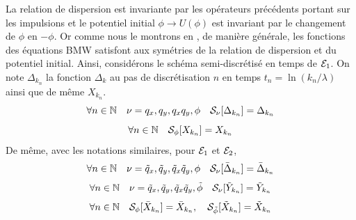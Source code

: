 \documentclass[10pt]{article}
\begin{document}
\begin{multicols}{2}
La relation de dispersion est invariante par les opérateurs précédents portant sur les impulsions et le potentiel initial $\phi \to U(\phi)$ est invariant par le changement de $\phi$ en $- \phi$. Or comme nous le montrons en , de manière générale, les fonctions des équations BMW satisfont aux symétries de la relation de dispersion et du potentiel initial. Ainsi, considérons le schéma semi-discrétisé en temps de $\mathcal{E}_1$. On note $\Delta_{k_n}$ la fonction $\Delta_k$ au pas de discrétisation $n$ en temps $t_n = \ln(k_n/\lambda)$ ainsi que de même $X_{k_n}$. 
\begin{equation}
\forall n \in \mathbb{N} \quad \nu =  q_x,q_y,q_xq_y,\phi \quad  \mathcal{S}_\nu[\Delta_{k_{n}}] = \Delta_{k_{n}} 
\end{equation}
\begin{equation}
\forall n \in \mathbb{N} \quad   \mathcal{S}_\phi[X_{k_{n}}] = X_{k_{n}} 
\end{equation}
De même, avec les notations similaires, pour $\mathcal{E}_1$ et $\mathcal{E}_2$,
\begin{equation}
\forall n \in \mathbb{N} \quad \nu =  \tilde{q}_x,\tilde{q}_y,\tilde{q}_x\tilde{q}_y,\phi \quad  \mathcal{S}_\nu[\bar{\Delta}_{k_{n}}] = \bar{\Delta}_{k_{n}} 
\end{equation}
\begin{equation}
\forall n \in \mathbb{N} \quad \nu =  \tilde{q}_x,\tilde{q}_y,\tilde{q}_x\tilde{q}_y,\tilde{\phi} \quad  \mathcal{S}_\nu[\tilde{Y}_{k_{n}}] = \tilde{Y}_{k_{n}} 
\end{equation}
\begin{equation}
\forall n \in \mathbb{N} \quad  \mathcal{S}_\phi[\bar{X}_{k_{n}}] = \bar{X}_{k_{n}}, \quad \mathcal{S}_{\tilde{\phi}}[\tilde{X}_{k_{n}}] = \tilde{X}_{k_{n}}
\end{equation}









\end{multicols}
\end{document}
